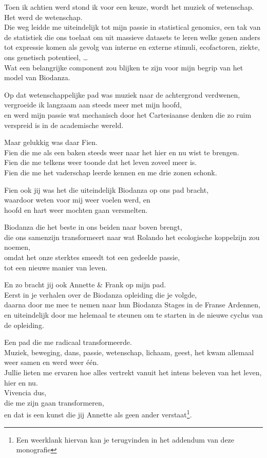 \documentclass[
  11pt,
]{book}
\begin{document}
Toen ik achtien werd stond ik voor een keuze, wordt het muziek of wetenschap.\\
Het werd de wetenschap.\\
Die weg leidde me uiteindelijk tot mijn passie in statistical genomics, een tak van de statistiek die ons toelaat om uit massieve datasets te leren welke genen anders tot expressie komen als gevolg van interne en externe stimuli, ecofactoren, ziekte, ons genetisch potentieel, \ldots{}\\
Wat een belangrijke component zou blijken te zijn voor mijn begrip van het model van Biodanza.

Op dat wetenschappelijke pad was muziek naar de achtergrond verdwenen,\\
vergroeide ik langzaam aan steeds meer met mijn hoofd,\\
en werd mijn passie wat mechanisch door het Cartesiaanse denken die zo ruim verspreid is in de academische wereld.

Maar gelukkig was daar Fien.\\
Fien die me als een baken steeds weer naar het hier en nu wist te brengen.\\
Fien die me telkens weer toonde dat het leven zoveel meer is.\\
Fien die me het vaderschap leerde kennen en me drie zonen schonk.

Fien ook jij was het die uiteindelijk Biodanza op ons pad bracht,\\
waardoor weten voor mij weer voelen werd, en\\
hoofd en hart weer mochten gaan versmelten.

Biodanza die het beste in ons beiden naar boven brengt,\\
die ons samenzijn transformeert naar wat Rolando
het ecologische koppelzijn zou noemen,\\
omdat het onze sterktes smeedt tot een gedeelde passie,\\
tot een nieuwe manier van leven.

En zo bracht jij ook Annette \& Frank op mijn pad.\\
Eerst in je verhalen over de Biodanza opleiding die je volgde,\\
daarna door me mee te nemen naar hun Biodanza Stages in de Franse Ardennen,\\
en uiteindelijk door me helemaal te steunen om te starten in de nieuwe cyclus van de opleiding.

Een pad die me radicaal transformeerde.\\
Muziek, beweging, dans, passie, wetenschap, lichaam, geest,
het kwam allemaal weer samen en werd weer één.\\
Jullie lieten me ervaren hoe alles vertrekt vanuit het intens beleven van het leven, hier en nu.\\
Vivencia dus,\\
die me zijn gaan transformeren,\\
en dat is een kunst die jij Annette als geen ander verstaat\footnote{Een weerklank hiervan kan je terugvinden in het addendum van deze monografie}.
\end{document}

